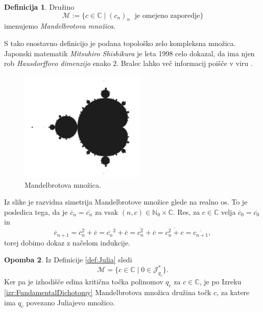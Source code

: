\documentclass[12pt,a4paper]{amsart}
\theoremstyle{definition} %
\newtheorem{definicija}{Definicija}[section]
\newtheorem{opomba}[definicija]{Opomba}
\theoremstyle{plain} %
\newcommand{\N}{\mathbb N}
\newcommand{\CC}{\mathbb C}
\newcommand{\M}{\mathscr M} %
\newcommand{\J}{\mathscr J} %
\begin{document}
\begin{definicija} \label {def:Mandelbrot}
Družino
$$\M := \{c \in \CC \mid  (c_n)_n \; \text{ je omejeno zaporedje}\}$$
imenujemo {\em Mandelbrotova množica}.
\end{definicija}

\noindent S tako enostavno definicijo je podana topološko zelo kompleksna množica.
Japonski matematik {\em Mitsuhiro Shishikura} je leta 1998 celo dokazal,
da ima njen rob {\em Hausdorffovo dimenzijo} enako $2$.
Bralec lahko več informacij poišče v viru \cite{shishikura}.

\begin{figure}[h]
\includegraphics[width=6cm]{graphics/mandelbrot_plain.png}
\caption{Mandelbrotova množica.}
\label{img:mandelbrotPlain}
\end{figure}

Iz slike je razvidna simetrija Mandelbrotove množice glede na realno os.
To je posledica tega, da je $\overline{c}_n = \overline{c_n}$ za vsak $(n, c) \in \N_0\times\CC$.
Res, za $c\in\CC$ velja $\overline{c}_0 = \overline{c_0}$ in
$$\overline{c}_{n+1} = \overline{c}_n^2 + \overline{c} = 
\overline{c_n}^2 + \overline{c} = \overline{c_n^2} + \overline{c} = \overline{c_n^2 + c} = \overline{c_{n+1}},$$
torej dobimo dokaz z načelom indukcije.

\begin{opomba}\label{op:MandelbrotMotivation}
Iz Definicije \ref{def:Julia} sledi
$$\M = \{c \in \CC \mid 0 \in \J_{q_c}^\ast\}.$$
Ker pa je izhodišče edina kritična točka polinomov $q_c$ za $c\in\CC$, je
po Izreku \ref{izr:FundamentalDichotomy} Mandelbrotova množica
družina točk $c$, za katere ima $q_c$ povezano Juliajevo množico.
\end{opomba}
\end{document}
